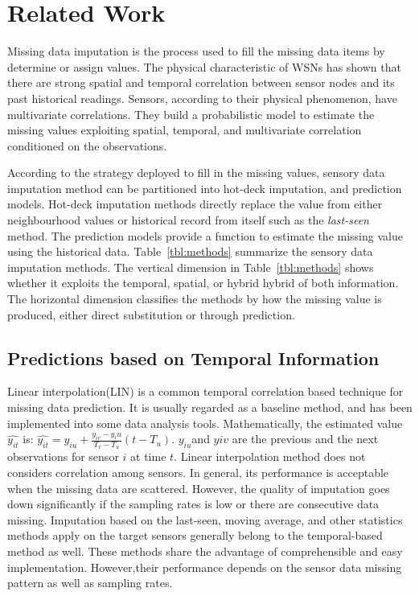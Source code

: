 \section{Related Work}\label{sec:rw}

Missing data imputation is the process used to fill the missing data items by determine or assign values\cite{Little:hotdeck}. The physical characteristic of WSNs has shown that there are strong spatial and temporal correlation between sensor nodes and its past historical readings\cite{akyildiz2004exploiting}. Sensors, according to their physical phenomenon, have multivariate correlations\cite{lou:multivariate_gap}. They build a probabilistic model to estimate the missing values exploiting spatial, temporal, and multivariate correlation conditioned on the observations. 

According to the strategy deployed to fill in the missing values,  sensory data imputation method can be partitioned into hot-deck imputation, and prediction models\cite{Garcia:KNNreview}. 
Hot-deck imputation methods directly replace the value from either neighbourhood values or historical record from itself such as the \textit{last-seen} method. 
The prediction models provide a function to estimate the missing value using the historical data. 
Table~\ref{tbl:methods} summarize the sensory data imputation methods. 
The vertical dimension in Table~\ref{tbl:methods} shows whether it exploits the temporal, spatial, or hybrid hybrid of both information. 
The horizontal dimension classifies the methods by how the missing value is produced, either direct substitution or through prediction. 

\subsection{Predictions based on Temporal Information }
Linear interpolation(LIN) is a common temporal correlation based technique for missing data prediction. 
It is usually regarded as a baseline method, and has been implemented into some data analysis tools. Mathematically, the estimated value $\hat{y_{it}}$ is:
$\hat{y_{it}} = y_{iu} + \frac{y_{iv}-y{_iu}}{T_v-T_u}(t-T_u)$.
$y_{iu}$and $y{iv}$ are the previous and the next observations for sensor $i$ at time $t$. 
Linear interpolation method does not considers correlation among sensors.
In general, its performance is acceptable when the missing data are scattered. 
However, the quality of imputation goes down significantly if the sampling rates is low or there are consecutive data missing. 
Imputation based on the last-seen, moving average, and other statistics methods apply on the target sensors generally belong to the temporal-based method as well.
These methods share the advantage of comprehensible and easy implementation. 
However,their performance depends on the sensor data missing pattern as well as sampling rates.   
